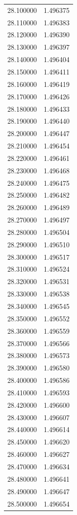 \begin{tabular}{rr}
28.100000 & 1.496375 \\
28.110000 & 1.496383 \\
28.120000 & 1.496390 \\
28.130000 & 1.496397 \\
28.140000 & 1.496404 \\
28.150000 & 1.496411 \\
28.160000 & 1.496419 \\
28.170000 & 1.496426 \\
28.180000 & 1.496433 \\
28.190000 & 1.496440 \\
28.200000 & 1.496447 \\
28.210000 & 1.496454 \\
28.220000 & 1.496461 \\
28.230000 & 1.496468 \\
28.240000 & 1.496475 \\
28.250000 & 1.496482 \\
28.260000 & 1.496489 \\
28.270000 & 1.496497 \\
28.280000 & 1.496504 \\
28.290000 & 1.496510 \\
28.300000 & 1.496517 \\
28.310000 & 1.496524 \\
28.320000 & 1.496531 \\
28.330000 & 1.496538 \\
28.340000 & 1.496545 \\
28.350000 & 1.496552 \\
28.360000 & 1.496559 \\
28.370000 & 1.496566 \\
28.380000 & 1.496573 \\
28.390000 & 1.496580 \\
28.400000 & 1.496586 \\
28.410000 & 1.496593 \\
28.420000 & 1.496600 \\
28.430000 & 1.496607 \\
28.440000 & 1.496614 \\
28.450000 & 1.496620 \\
28.460000 & 1.496627 \\
28.470000 & 1.496634 \\
28.480000 & 1.496641 \\
28.490000 & 1.496647 \\
28.500000 & 1.496654 \\

\end{tabular}
